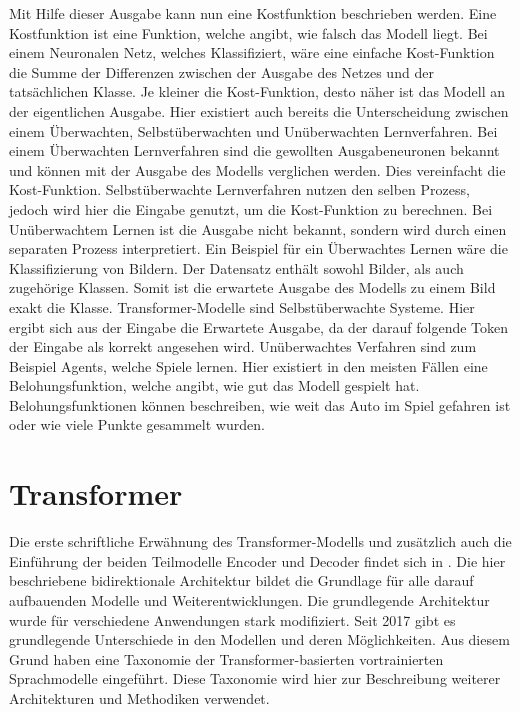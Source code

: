Mit Hilfe dieser Ausgabe kann nun eine Kostfunktion beschrieben werden.
Eine Kostfunktion ist eine Funktion, welche angibt, wie falsch das Modell liegt.
Bei einem Neuronalen Netz, welches Klassifiziert, wäre eine einfache Kost-Funktion die Summe der Differenzen zwischen der Ausgabe des Netzes und der tatsächlichen Klasse.
Je kleiner die Kost-Funktion, desto näher ist das Modell an der eigentlichen Ausgabe.
Hier existiert auch bereits die Unterscheidung zwischen einem Überwachten, Selbstüberwachten und Unüberwachten Lernverfahren.
Bei einem Überwachten Lernverfahren sind die gewollten Ausgabeneuronen bekannt und können mit der Ausgabe des Modells verglichen werden.
Dies vereinfacht die Kost-Funktion.
Selbstüberwachte Lernverfahren nutzen den selben Prozess, jedoch wird hier die Eingabe genutzt, um die Kost-Funktion zu berechnen.
Bei Unüberwachtem Lernen ist die Ausgabe nicht bekannt, sondern wird durch einen separaten Prozess interpretiert.
Ein Beispiel für ein Überwachtes Lernen wäre die Klassifizierung von Bildern.
Der Datensatz enthält sowohl Bilder, als auch zugehörige Klassen.
Somit ist die erwartete Ausgabe des Modells zu einem Bild exakt die Klasse.
Transformer-Modelle sind Selbstüberwachte Systeme.
Hier ergibt sich aus der Eingabe die Erwartete Ausgabe, da der darauf folgende Token der Eingabe als korrekt angesehen wird.
Unüberwachtes Verfahren sind zum Beispiel Agents, welche Spiele lernen.
Hier existiert in den meisten Fällen eine Belohungsfunktion, welche angibt, wie gut das Modell gespielt hat.
Belohungsfunktionen können beschreiben, wie weit das Auto im Spiel gefahren ist oder wie viele Punkte gesammelt wurden.\\

\section{Transformer}\label{sec:transformer}
%
Die erste schriftliche Erwähnung des Transformer-Modells und zusätzlich auch die Einführung der beiden Teilmodelle Encoder und Decoder findet sich in \citet{attention}.
Die hier beschriebene bidirektionale Architektur bildet die Grundlage für alle darauf aufbauenden Modelle und Weiterentwicklungen.
Die grundlegende Architektur wurde für verschiedene Anwendungen stark modifiziert.
Seit 2017 gibt es grundlegende Unterschiede in den Modellen und deren Möglichkeiten.
Aus diesem Grund haben \citet{ammus} eine Taxonomie der Transformer-basierten vortrainierten Sprachmodelle eingeführt.
Diese Taxonomie wird hier zur Beschreibung weiterer Architekturen und Methodiken verwendet.\\

